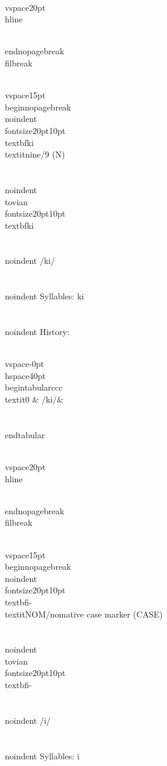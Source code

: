 \\vspace{20pt}\\hline

\\end{nopagebreak}
\\filbreak



\\vspace{15pt}
\\begin{nopagebreak}
\\noindent{\\fontsize{20pt}{10pt}\\textbf{ki} } \\textit{nine/9} (N)\\\\
\\noindent {\\tovian \\fontsize{20pt}{10pt} \\textbf{ki} }\\\\
\\noindent /k{\textprimstress}i/\\\\
\\noindent Syllables: ki\\\\


\\noindent History:

\\vspace{-0pt}
\\hspace{40pt}
\\begin{tabular}{ccc}
\\textit{0} & /ki/& \\\\
\\end{tabular}

\\vspace{20pt}\\hline

\\end{nopagebreak}
\\filbreak



\\vspace{15pt}
\\begin{nopagebreak}
\\noindent{\\fontsize{20pt}{10pt}\\textbf{i-} } \\textit{NOM/nomative case marker} (CASE)\\\\
\\noindent {\\tovian \\fontsize{20pt}{10pt} \\textbf{i-} }\\\\
\\noindent /{\textprimstress}i/\\\\
\\noindent Syllables: i\\\\


